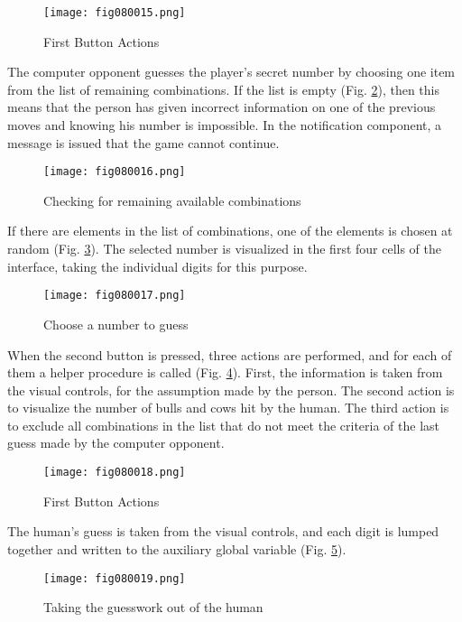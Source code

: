 \begin{figure}[H]
   \centering
   \texttt{[image: fig080015.png]}
   \caption{First Button Actions}
\label{fig080015}
\end{figure}

The computer opponent guesses the player's secret number by choosing one item from the list of remaining combinations. If the list is empty (Fig. \ref{fig080016}), then this means that the person has given incorrect information on one of the previous moves and knowing his number is impossible. In the notification component, a message is issued that the game cannot continue.

\begin{figure}[H]
   \centering
   \texttt{[image: fig080016.png]}
   \caption{Checking for remaining available combinations}
\label{fig080016}
\end{figure}

If there are elements in the list of combinations, one of the elements is chosen at random (Fig. \ref{fig080017}). The selected number is visualized in the first four cells of the interface, taking the individual digits for this purpose.

\begin{figure}[H]
   \centering
   \texttt{[image: fig080017.png]}
   \caption{Choose a number to guess}
\label{fig080017}
\end{figure}

When the second button is pressed, three actions are performed, and for each of them a helper procedure is called (Fig. \ref{fig080018}). First, the information is taken from the visual controls, for the assumption made by the person. The second action is to visualize the number of bulls and cows hit by the human. The third action is to exclude all combinations in the list that do not meet the criteria of the last guess made by the computer opponent.

\begin{figure}[H]
   \centering
   \texttt{[image: fig080018.png]}
   \caption{First Button Actions}
\label{fig080018}
\end{figure}

The human's guess is taken from the visual controls, and each digit is lumped together and written to the auxiliary global variable (Fig. \ref{fig080019}).

\begin{figure}[H]
   \centering
   \texttt{[image: fig080019.png]}
   \caption{Taking the guesswork out of the human}
\label{fig080019}
\end{figure}


